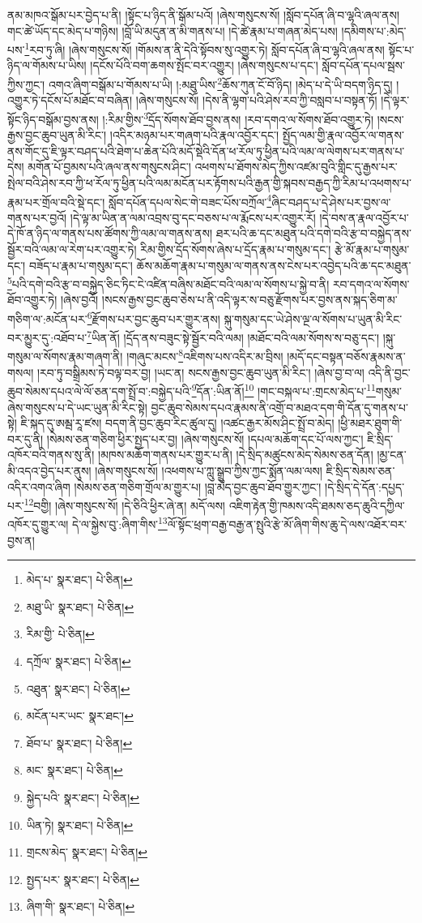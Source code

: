 ནམ་མཁའ་སྒོམ་པར་བྱེད་པ་ནི། །སྟོང་པ་ཉིད་ནི་སྒོམ་པའོ། །ཞེས་གསུངས་སོ། །སློབ་དཔོན་ཞི་བ་ལྷའི་ཞལ་ནས། གང་ཚེ་ཡོད་དང་མེད་པ་གཉིས། །བློ་ཡི་མདུན་ན་མི་གནས་པ། །དེ་ཚེ་རྣམ་པ་གཞན་མེད་པས། །དམིགས་པ་:མེད་པས་\footnote{མེད་པ་  སྣར་ཐང་།  པེ་ཅིན། }རབ་ཏུ་ཞི། །ཞེས་གསུངས་སོ། །གོམས་ན་ནི་དེའི་སྟོབས་སུ་འགྱུར་ཏེ། སློབ་དཔོན་ཞི་བ་ལྷའི་ཞལ་ནས། སྟོང་པ་ཉིད་ལ་གོམས་པ་ཡིས། །དངོས་པོའི་བག་ཆགས་སྤོང་བར་འགྱུར། །ཞེས་གསུངས་པ་དང་། སློབ་དཔོན་དཔལ་སྦས་ཀྱིས་ཀྱང་། འགའ་ཞིག་བསྒོམ་པ་གོམས་པ་ཡི། །:མཐུ་ཡིས་\footnote{མཐུ་ཡི་  སྣར་ཐང་།  པེ་ཅིན། }ཆོས་ཀུན་ངོ་བོ་ཉིད། །མེད་པ་དེ་ཡི་བདག་ཉིད་དུ། །འགྱུར་ཏེ་དངོས་པོ་མཐོང་བ་བཞིན། །ཞེས་གསུངས་སོ། །དེས་ནི་ལྷག་པའི་ཤེས་རབ་ཀྱི་བསླབ་པ་བསྟན་ཏོ། །དེ་ལྟར་སྟོང་ཉིད་བསྒོམ་བྱས་ནས། །:རིམ་གྱིས་\footnote{རིམ་གྱི་  པེ་ཅིན། }དྲོད་སོགས་ཐོབ་བྱས་ནས། །རབ་དགའ་ལ་སོགས་ཐོབ་འགྱུར་ཏེ། །སངས་རྒྱས་བྱང་ཆུབ་ཡུན་མི་རིང་། །འདིར་མཉམ་པར་གཞག་པའི་རྣལ་འབྱོར་དང་། སྤྱོད་ལམ་གྱི་རྣལ་འབྱོར་ལ་གནས་ནས་གོང་དུ་ཇི་ལྟར་བཤད་པའི་ཐེག་པ་ཆེན་པོའི་མདོ་སྡེའི་དོན་ཕ་རོལ་ཏུ་ཕྱིན་པའི་ལམ་ལ་ལེགས་པར་གནས་པ་དེས། མགོན་པོ་བྱམས་པའི་ཞལ་ནས་གསུངས་ཤིང་། འཕགས་པ་ཐོགས་མེད་ཀྱིས་འཛམ་བུའི་གླིང་དུ་རྒྱས་པར་སྤེལ་བའི་ཤེས་རབ་ཀྱི་ཕ་རོལ་ཏུ་ཕྱིན་པའི་ལམ་མངོན་པར་རྟོགས་པའི་རྒྱན་གྱི་སྐབས་བརྒྱད་ཀྱི་རིམ་པ་འཕགས་པ་རྣམ་པར་གྲོལ་བའི་སྡེ་དང་། སློབ་དཔོན་དཔལ་སེང་གེ་བཟང་པོས་བཀྲོལ་\footnote{དཀྲོལ་  སྣར་ཐང་།  པེ་ཅིན། }ཞིང་བཤད་པ་དེ་ཤེས་པར་བྱས་ལ་གནས་པར་བྱའོ། །དེ་ལྟ་མ་ཡིན་ན་ལམ་འབྲས་བུ་དང་བཅས་པ་ལ་རྨོངས་པར་འགྱུར་རོ། །དེ་བས་ན་རྣལ་འབྱོར་པ་དེ་ཁོ་ན་ཉིད་ལ་གནས་པས་ཚོགས་ཀྱི་ལམ་ལ་གནས་ནས། ཐར་པའི་ཆ་དང་མཐུན་པའི་དགེ་བའི་རྩ་བ་བསྐྱེད་ནས་སྦྱོར་བའི་ལམ་ལ་རེག་པར་འགྱུར་ཏེ། རིམ་གྱིས་དྲོད་སོགས་ཞེས་པ་དྲོད་རྣམ་པ་གསུམ་དང་། རྩེ་མོ་རྣམ་པ་གསུམ་དང་། བཟོད་པ་རྣམ་པ་གསུམ་དང་། ཆོས་མཆོག་རྣམ་པ་གསུམ་ལ་གནས་ནས་ངེས་པར་འབྱེད་པའི་ཆ་དང་མཐུན་\footnote{འཐུན་  སྣར་ཐང་།  པེ་ཅིན། }པའི་དགེ་བའི་རྩ་བ་བསྐྱེད་ཅིང་ཏིང་ངེ་འཛིན་བཞིས་མཐོང་བའི་ལམ་ལ་སོགས་པ་སྐྱེ་བ་ནི། རབ་དགའ་ལ་སོགས་ཐོབ་འགྱུར་ཏེ། །ཞེས་བྱའོ། །སངས་རྒྱས་བྱང་ཆུབ་ཅེས་པ་ནི་འདི་ལྟར་ས་བཅུ་རྫོགས་པར་བྱས་ནས་སྐད་ཅིག་མ་གཅིག་ལ་:མངོན་པར་\footnote{མངོན་པར་ཡང་  སྣར་ཐང་། }རྫོགས་པར་བྱང་ཆུབ་པར་གྱུར་ནས། སྐུ་གསུམ་དང་ཡེ་ཤེས་ལྔ་ལ་སོགས་པ་ཡུན་མི་རིང་བར་མྱུར་དུ་:འཐོབ་པ་\footnote{ཐོབ་པ་  སྣར་ཐང་།  པེ་ཅིན། }ཡིན་ནོ། །དྲོད་ནས་བཟུང་སྟེ་སྦྱོར་བའི་ལམ། །མཐོང་བའི་ལམ་སོགས་ས་བཅུ་དང་། །སྐུ་གསུམ་ལ་སོགས་རྣམ་གཞག་ནི། །གཞུང་མངས་\footnote{མང་  སྣར་ཐང་།  པེ་ཅིན། }འཇིགས་པས་འདིར་མ་བྲིས། །མདོ་དང་བསྟན་བཅོས་རྣམས་ན་གསལ། །རབ་ཏུ་བསྒྲིམས་ཏེ་བལྟ་བར་བྱ། །ཡང་ན། སངས་རྒྱས་བྱང་ཆུབ་ཡུན་མི་རིང་། །ཞེས་བྱ་བ་ལ། འདི་ནི་བྱང་ཆུབ་སེམས་དཔའ་ལེ་ལོ་ཅན་དག་སྤྲོ་བ་:བསྐྱེད་པའི་\footnote{སྐྱེད་པའི་  སྣར་ཐང་།  པེ་ཅིན། }དོན་:ཡིན་ནོ།\footnote{ཡིན་ཏེ།  སྣར་ཐང་།  པེ་ཅིན། } །གང་བསྐལ་པ་:གྲངས་མེད་པ་\footnote{གྲངས་མེད་  སྣར་ཐང་།  པེ་ཅིན། }གསུམ་ཞེས་གསུངས་པ་དེ་ཡང་ཡུན་མི་རིང་སྟེ། བྱང་ཆུབ་སེམས་དཔའ་རྣམས་ནི་འགྲོ་བ་མཐའ་དག་གི་དོན་དུ་གནས་པ་སྟེ། ཇི་སྐད་དུ་ཨམྦ་རཱ་ཛས། བདག་ནི་བྱང་ཆུབ་རིང་ཚུལ་དུ། །འཚང་རྒྱར་མོས་ཤིང་སྤྲོ་བ་མེད། །ཕྱི་མཐར་ཐུག་གི་བར་དུ་ནི། །སེམས་ཅན་གཅིག་ཕྱིར་སྤྱད་པར་བྱ། །ཞེས་གསུངས་སོ། །དཔལ་མཆོག་དང་པོ་ལས་ཀྱང་། ཇི་སྲིད་འཁོར་བའི་གནས་སུ་ནི། །མཁས་མཆོག་གནས་པར་གྱུར་པ་ནི། །དེ་སྲིད་མཚུངས་མེད་སེམས་ཅན་དོན། །མྱ་ངན་མི་འདའ་བྱེད་པར་ནུས། །ཞེས་གསུངས་སོ། །འཕགས་པ་ཀླུ་སྒྲུབ་ཀྱིས་ཀྱང་སྨོན་ལམ་ལས། ཇི་སྲིད་སེམས་ཅན་འདིར་འགའ་ཞིག །སེམས་ཅན་གཅིག་གྲོལ་མ་གྱུར་པ། །བླ་མེད་བྱང་ཆུབ་ཐོབ་གྱུར་ཀྱང་། །དེ་སྲིད་དེ་དོན་:དཔྱད་པར་\footnote{སྤྱད་པར་  སྣར་ཐང་།  པེ་ཅིན། }བགྱི། །ཞེས་གསུངས་སོ། །དེ་ཅིའི་ཕྱིར་ཞེ་ན། མདོ་ལས། འཇིག་རྟེན་གྱི་ཁམས་འདི་ཐམས་ཅད་ཆུའི་དཀྱིལ་འཁོར་དུ་གྱུར་ལ། དེ་ལ་སྐྱེས་བུ་:ཞིག་གིས་\footnote{ཞིག་གི་  སྣར་ཐང་།  པེ་ཅིན། }ལོ་སྟོང་ཕྲག་བརྒྱ་བརྒྱ་ན་སྤུའི་རྩེ་མོ་ཞིག་གིས་ཆུ་དེ་ལས་འཐོར་བར་བྱས་ན། 